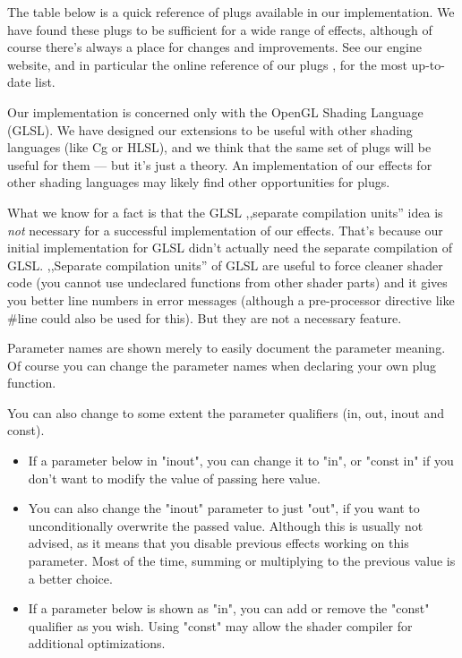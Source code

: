 \documentclass{acmsiggraph}                     %
\begin{document}
The table below is a quick reference of plugs available in our
implementation. We have found these plugs to be sufficient for a wide
range of effects, although of course there's always a place for
changes and improvements. See our engine website, and in
particular the online reference of our plugs \cite{vrmleng:plugs}, for
the most up-to-date list.

Our implementation is concerned only with the OpenGL Shading Language
(GLSL). We have designed our extensions to be useful with other
shading languages (like Cg or HLSL), and we think that the same set of
plugs will be useful for them --- but it's just a theory. An
implementation of our effects for other shading languages may likely
find other opportunities for plugs.

What we know for a fact is that the GLSL ,,separate compilation
units'' idea is \textit{not} necessary for a successful
implementation of our effects. That's because our initial
implementation for GLSL didn't actually need the separate compilation
of GLSL. ,,Separate compilation units'' of GLSL are useful to force
cleaner shader code (you cannot use undeclared functions from other
shader parts) and it gives you better line numbers in error messages
(although a pre-processor directive like \#line could also be used for
this). But they are not a necessary feature.

Parameter names are shown merely to easily document the parameter
meaning. Of course you can change the parameter names when declaring
your own plug function.

You can also change to some extent the parameter qualifiers (in, out,
inout and const).

\begin{itemize}
  \item If a parameter below in "inout", you can change it to "in", or
    "const in" if you don't want to modify the value of passing here
    value.
  \item You can also change the "inout" parameter to just "out", if
    you want to unconditionally overwrite the passed value. Although
    this is usually not advised, as it means that you disable previous
    effects working on this parameter. Most of the time, summing or
    multiplying to the previous value is a better choice.
  \item If a parameter below is shown as "in", you can add or remove
    the "const" qualifier as you wish. Using "const" may allow the
    shader compiler for additional optimizations.
\end{itemize}
\end{document}
